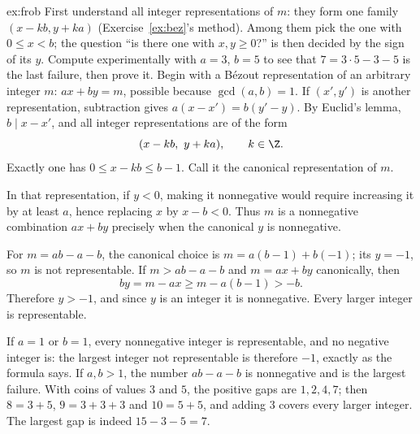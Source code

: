 \begin{solution}{ex:frob}
\idea First understand all integer representations of $m$: they form one family $(x-kb,y+ka)$ (Exercise~\ref{ex:bez}'s method). Among them pick the one with $0\le x<b$; the question ``is there one with $x,y\ge0$?'' is then decided by the sign of its $y$. Compute experimentally with $a=3$, $b=5$ to see that $7=3\cdot5-3-5$ is the last failure, then prove it.
\writeup Begin with a B\'ezout representation of an arbitrary integer $m$:
$ax+by=m$, possible because $\gcd(a,b)=1$. If $(x',y')$ is another representation, subtraction gives
$a(x-x')=b(y'-y)$. By Euclid's lemma, $b\mid x-x'$, and all integer representations are of the form
\[
(x-kb,\ y+ka),\qquad k\in\Z.
\]
Exactly one has $0\le x-kb\le b-1$. Call it the canonical representation of $m$.

In that representation, if $y<0$, making it nonnegative would require increasing it by at least $a$, hence replacing $x$ by $x-b<0$. Thus $m$ is a nonnegative combination $ax+by$ precisely when the canonical $y$ is nonnegative.

For $m=ab-a-b$, the canonical choice is
$m=a(b-1)+b(-1)$; its $y=-1$, so $m$ is not representable. If $m>ab-a-b$ and $m=ax+by$ canonically, then
\[
by=m-ax\ge m-a(b-1)>-b.
\]
Therefore $y>-1$, and since $y$ is an integer it is nonnegative. Every larger integer is representable.

If $a=1$ or $b=1$, every nonnegative integer is representable, and no negative integer is: the largest integer not representable is therefore $-1$, exactly as the formula says. If $a,b>1$, the number $ab-a-b$ is nonnegative and is the largest failure. With coins of values $3$ and $5$, the positive gaps are $1,2,4,7$; then $8=3+5$, $9=3+3+3$ and $10=5+5$, and adding $3$ covers every larger integer. The largest gap is indeed $15-3-5=7$.
\end{solution}

